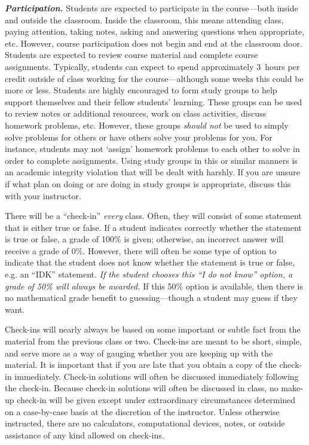 \documentclass[11pt,letterpaper]{article}
\begin{document}
{\itshape\bfseries\color{scred}Participation.} 
Students are expected to participate in the course---both inside and outside the classroom. Inside the classroom, this means attending class, paying attention, taking notes, asking and answering questions when appropriate, etc. However, course participation does not begin and end at the classroom door. Students are expected to review course material and complete course assignments. Typically, students can expect to spend approximately 3~hours per credit outside of class working for the course---although some weeks this could be more or less. Students are highly encouraged to form study groups to help support themselves and their fellow students' learning. These groups can be used to review notes or additional resources, work on class activities, discuss homework problems, etc. However, these groups {\itshape should not} be used to simply solve problems for others or have others solve your problems for you. For instance, students may not `assign' homework problems to each other to solve in order to complete assignments. Using study groups in this or similar manners is an academic integrity violation that will be dealt with harshly. If you are unsure if what plan on doing or are doing in study groups is appropriate, discuss this with your instructor. \sectionbreak




There will be a ``check-in'' \textit{every} class. Often, they will consist of some statement that is either true or false. If a student indicates correctly whether the statement is true or false, a grade of 100\% is given; otherwise, an incorrect answer will receive a grade of 0\%. However, there will often be some type of option to indicate that the student does not know whether the statement is true or false, e.g. an ``IDK'' statement. {\itshape If the student chooses this ``I do not know'' option, a grade of 50\% will always be awarded.} If this 50\% option is available, then there is no mathematical grade benefit to guessing---though a student may guess if they want. \pspace

Check-ins will nearly always be based on some important or subtle fact from the material from the previous class or two. Check-ins are meant to be short, simple, and serve more as a way of gauging whether you are keeping up with the material. It is important that if you are late that you obtain a copy of the check-in immediately. Check-in solutions will often be discussed immediately following the check-in. Because check-in solutions will often be discussed in class, no make-up check-in will be given except under extraordinary circumstances determined on a case-by-case basis at the discretion of the instructor. Unless otherwise instructed, there are no calculators, computational devices, notes, or outside assistance of any kind allowed on check-ins. 
\par\vspace{0.5cm}
\end{document}
